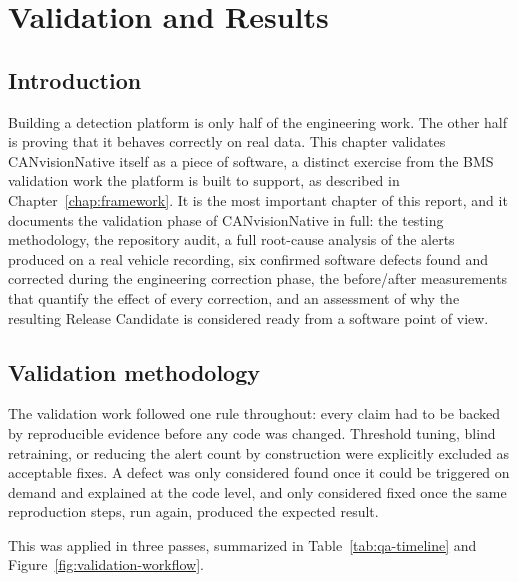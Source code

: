 \chapter{Validation and Results}
\label{chap:validation}

\section{Introduction}

Building a detection platform is only half of the engineering work. The other half is proving that it behaves correctly on real data. This chapter validates CANvisionNative itself as a piece of software, a distinct exercise from the BMS validation work the platform is built to support, as described in Chapter~\ref{chap:framework}. It is the most important chapter of this report, and it documents the validation phase of CANvisionNative in full: the testing methodology, the repository audit, a full root-cause analysis of the alerts produced on a real vehicle recording, six confirmed software defects found and corrected during the engineering correction phase, the before/after measurements that quantify the effect of every correction, and an assessment of why the resulting Release Candidate is considered ready from a software point of view.

\section{Validation methodology}

The validation work followed one rule throughout: every claim had to be backed by reproducible evidence before any code was changed. Threshold tuning, blind retraining, or reducing the alert count by construction were explicitly excluded as acceptable fixes. A defect was only considered found once it could be triggered on demand and explained at the code level, and only considered fixed once the same reproduction steps, run again, produced the expected result.

This was applied in three passes, summarized in Table~\ref{tab:qa-timeline} and Figure~\ref{fig:validation-workflow}.

